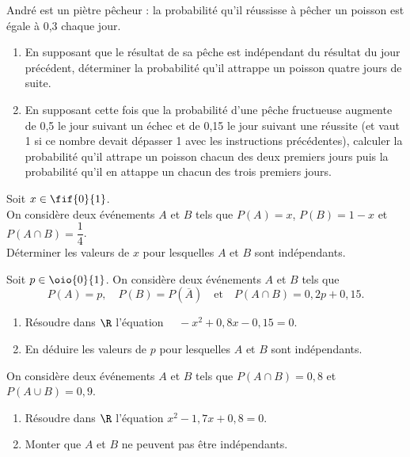 \documentclass[a4paper,11pt,exos]{nsi} %
\begin{document}
\exo{}
André est un piètre  pêcheur : la probabilité qu'il réussisse à pêcher un poisson est égale à 0,3 chaque jour.
\begin{enumerate}
    \item En supposant que le résultat de sa pêche est indépendant du résultat du jour précédent, déterminer la probabilité qu'il attrappe un poisson quatre jours de suite.
    \item En supposant cette fois que la probabilité d'une pêche fructueuse augmente de 0,5 le jour suivant un échec et de 0,15 le jour suivant une réussite (et vaut 1 si ce nombre devait dépasser 1 avec les instructions précédentes), calculer la probabilité qu'il attrape un poisson chacun des deux premiers jours puis la probabilité qu'il en attappe un chacun des trois premiers jours.
\end{enumerate}



\exo{}
Soit $x\in\fif{0}{1}$.\\
On considère deux événements $A$ et $B$ tels que $P(A)=x$, $P(B)=1-x$ et $P(A\cap B)=\dfrac{1}{4}$.\\
Déterminer les valeurs de $x$ pour lesquelles $A$ et $B$ sont indépendants.



\exo{}
Soit $p\in\oio{0}{1}$. On considère deux événements $A$ et $B$ tels que $$P(A)=p,\quad P(B)=P(\overline{A})\quad \text{et}\quad P(A\cap B)=0,2p+0,15.$$
\begin{enumerate}
    \item Résoudre dans $\R$ l'équation $\quad -x^2+0,8x-0,15=0$.
    \item En déduire les valeurs de $p$ pour lesquelles $A$ et $B$ sont indépendants.
\end{enumerate}




\exo{ \faStar\faStar}
On considère deux événements $A$ et $B$ tels que $P(A\cap B)=0,8$ et $P(A\cup B)=0,9$.
\begin{enumerate}
    \item Résoudre dans $\R$ l'équation $x^2-1,7x+0,8=0$.
    \item Monter que $A$ et $B$ ne peuvent pas être indépendants.
\end{enumerate}
\end{document}
